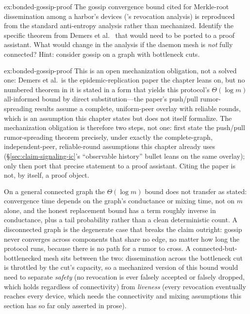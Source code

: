 \documentclass[11pt,a4paper]{article}
\theoremstyle{definition}
\theoremstyle{remark}
\begin{document}
\begin{pdexercise}[kind=Open,rating=3]{ex:bonded-gossip-proof}
The gossip convergence bound cited for Merkle-root dissemination among a harbor's devices ('s revocation analysis) is reproduced from the standard anti-entropy analysis rather than mechanized. Identify the specific theorem from Demers et al.~ that would need to be ported to a proof assistant. What would change in the analysis if the daemon mesh is \emph{not} fully connected? Hint: consider gossip on a graph with bottleneck cuts.
\end{pdexercise}
\begin{pdsolution}{ex:bonded-gossip-proof}
This is an open mechanization obligation, not a solved one: Demers et al.\ is the epidemic-replication paper the chapter leans on, but no numbered theorem in it is stated in a form that yields this protocol's $\Theta(\log m)$ all-informed bound by direct substitution---the paper's push/pull rumor-spreading results assume a complete, uniform-peer overlay with reliable rounds, which is an assumption this chapter states but does not itself formalize. The mechanization obligation is therefore two steps, not one: first state the push/pull rumor-spreading theorem precisely, under exactly the complete-graph, independent-peer, reliable-round assumptions this chapter already uses (\S\ref{sec:claim-signaling-ic}'s ``observable history'' bullet leans on the same overlay); only then port that precise statement to a proof assistant. Citing the paper is not, by itself, a proof object.

On a general connected graph the $\Theta(\log m)$ bound does not transfer as stated: convergence time depends on the graph's conductance or mixing time, not on $m$ alone, and the honest replacement bound has a term roughly inverse in conductance, plus a tail probability rather than a clean deterministic count. A disconnected graph is the degenerate case that breaks the claim outright: gossip never converges across components that share no edge, no matter how long the protocol runs, because there is no path for a rumor to cross. A connected-but-bottlenecked mesh sits between the two: dissemination across the bottleneck cut is throttled by the cut's capacity, so a mechanized version of this bound would need to separate \emph{safety} (no revocation is ever falsely accepted or falsely dropped, which holds regardless of connectivity) from \emph{liveness} (every revocation eventually reaches every device, which needs the connectivity and mixing assumptions this section has so far only asserted in prose).
\end{pdsolution}
\end{document}
